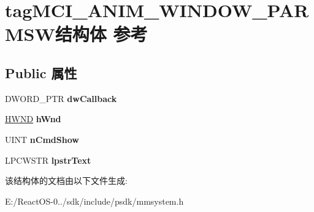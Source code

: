 \hypertarget{structtag_m_c_i___a_n_i_m___w_i_n_d_o_w___p_a_r_m_s_w}{}\section{tag\+M\+C\+I\+\_\+\+A\+N\+I\+M\+\_\+\+W\+I\+N\+D\+O\+W\+\_\+\+P\+A\+R\+M\+S\+W结构体 参考}
\label{structtag_m_c_i___a_n_i_m___w_i_n_d_o_w___p_a_r_m_s_w}
\subsection*{Public 属性}
\begin{DoxyCompactItemize}
\item 
\mbox{\label{structtag_m_c_i___a_n_i_m___w_i_n_d_o_w___p_a_r_m_s_w_aab73da840fb350010b8a473192177ce3}} 
D\+W\+O\+R\+D\+\_\+\+P\+TR {\bfseries dw\+Callback}
\item 
\mbox{\label{structtag_m_c_i___a_n_i_m___w_i_n_d_o_w___p_a_r_m_s_w_afcb964dc87cf7bcc2504accf53a93793}} 
\hyperlink{interfacevoid}{H\+W\+ND} {\bfseries h\+Wnd}
\item 
\mbox{\label{structtag_m_c_i___a_n_i_m___w_i_n_d_o_w___p_a_r_m_s_w_aa4b47b61f67ee193285e92f24d6c0c86}} 
U\+I\+NT {\bfseries n\+Cmd\+Show}
\item 
\mbox{\label{structtag_m_c_i___a_n_i_m___w_i_n_d_o_w___p_a_r_m_s_w_ae5d02eabc0145167b0d5cb0c6958ca96}} 
L\+P\+C\+W\+S\+TR {\bfseries lpstr\+Text}
\end{DoxyCompactItemize}


该结构体的文档由以下文件生成\+:\begin{DoxyCompactItemize}
\item 
E\+:/\+React\+O\+S-\/0../sdk/include/psdk/mmsystem.\+h\end{DoxyCompactItemize}
